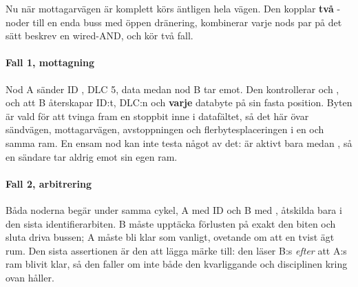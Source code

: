 Nu när mottagarvägen är komplett körs  äntligen hela vägen.
Den kopplar \textbf{två} -noder till en enda buss med öppen dränering, kombinerar
varje nods par  på det sätt  beskrev en wired-AND, och kör
två fall.

\paragraph{Fall 1, mottagning}
Nod A sänder ID , DLC 5, data  medan nod B tar emot. Den
kontrollerar  och , och att B återskapar ID:t, DLC:n och \textbf{varje}
databyte på sin fasta position. Byten  är vald för att tvinga fram en stoppbit inne i
datafältet, så det här övar sändvägen, mottagarvägen, avstoppningen och flerbytesplaceringen i en och
samma ram. En ensam nod kan inte testa något av det:  är aktivt bara medan
, så en sändare tar aldrig emot sin egen ram.

\paragraph{Fall 2, arbitrering}
Båda noderna begär under samma cykel, A med ID  och B med , åtskilda bara i
den sista identifierarbiten. B måste upptäcka förlusten på exakt den biten och sluta driva bussen; A
måste bli klar som vanligt, ovetande om att en tvist ägt rum. Den sista assertionen är den att lägga
märke till: den läser B:s  \emph{efter} att A:s ram blivit klar, så den faller om inte
både den kvarliggande  och disciplinen kring  ovan håller.
